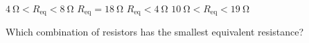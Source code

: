 \documentclass[answers]{exam}
\begin{document}
\begin{questions}
\begin{randomizeoneparchoices}
    \choice $\SI{4}{\ohm} < R_\mathrm{eq} < \SI{8}{\ohm}$
    \choice $R_\mathrm{eq} = \SI{18}{\ohm}$
    \correctchoice $R_\mathrm{eq} < \SI{4}{\ohm}$
    \choice $\SI{10}{\ohm} < R_\mathrm{eq} < \SI{19}{\ohm}$
\end{randomizeoneparchoices}


\question
Which combination of resistors has the smallest equivalent resistance?


\end{questions}
\end{document}
